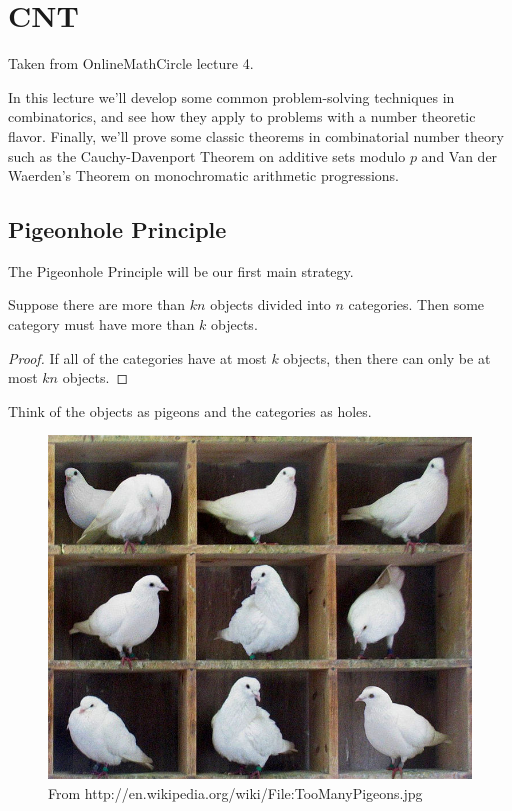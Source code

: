 \chapter{CNT}
Taken from OnlineMathCircle lecture 4.

In this lecture we'll develop some common problem-solving techniques in combinatorics, and see how they apply to problems with a number theoretic flavor. Finally, we'll prove some classic theorems in combinatorial number theory such as the Cauchy-Davenport Theorem on additive sets modulo $p$ and Van der Waerden's Theorem on monochromatic arithmetic progressions.
\section{Pigeonhole Principle}
The Pigeonhole Principle will be our first main strategy.
\begin{thm}
Suppose there are more than $kn$ objects divided into $n$ categories. Then some category must have more than $k$ objects.
\end{thm}
\begin{proof}
If all of the categories have at most $k$ objects, then there can only be at most $kn$ objects. 
\end{proof}
Think of the objects as pigeons and the categories as holes.

\begin{figure}[h!]
\centering
\includegraphics[scale=0.5]{cnt-chapters/toomanypigeons}
\caption{From http://en.wikipedia.org/wiki/File:TooManyPigeons.jpg}
\end{figure}

